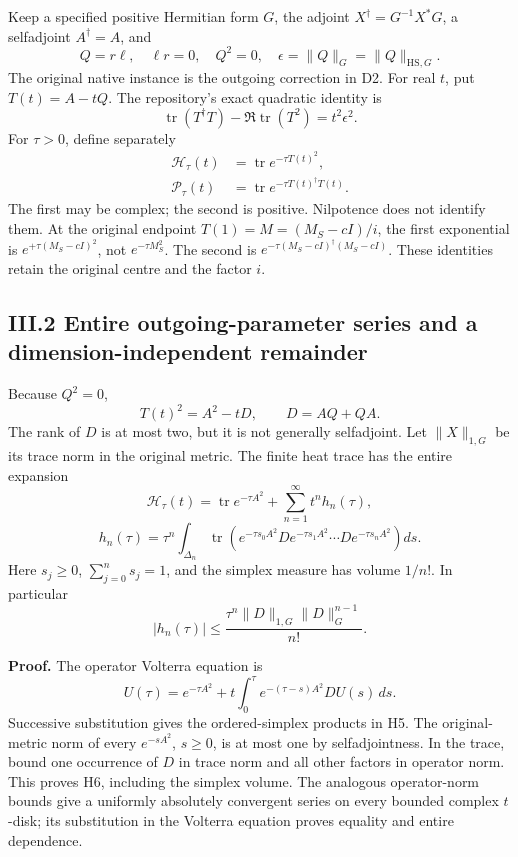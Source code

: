 Keep a specified positive Hermitian form \(G\), the adjoint
\(X^\dagger=G^{-1}X^*G\), a selfadjoint \(A^\dagger=A\), and \[
Q=r\ell,\quad \ell r=0,\quad Q^2=0,\quad
\epsilon=\|Q\|_G=\|Q\|_{\mathrm{HS},G}.
\] The original native instance is the outgoing correction in D2. For
real \(t\), put \(T(t)=A-tQ\). The repository's exact quadratic identity
is \[
\operatorname{tr}(T^\dagger T)-\Re\operatorname{tr}(T^2)
=t^2\epsilon^2.
\tag{H1}
\] For \(\tau>0\), define separately \[
\begin{aligned}
\mathcal H_\tau(t)&=\operatorname{tr}e^{-\tau T(t)^2},\\
\mathcal P_\tau(t)&=\operatorname{tr}e^{-\tau T(t)^\dagger T(t)}.
\end{aligned}
\tag{H2}
\] The first may be complex; the second is positive. Nilpotence does not
identify them. At the original endpoint \(T(1)=M=(M_S-cI)/i\), the first
exponential is \(e^{+\tau(M_S-cI)^2}\), not \(e^{-\tau M_S^2}\). The
second is \(e^{-\tau(M_S-cI)^\dagger(M_S-cI)}\). These identities retain
the original centre and the factor \(i\).

\subsection{III.2 Entire outgoing-parameter series and a
dimension-independent
remainder}\label{iii.2-entire-outgoing-parameter-series-and-a-dimension-independent-remainder}

Because \(Q^2=0\), \[
T(t)^2=A^2-tD,\qquad D=AQ+QA.
\tag{H3}
\] The rank of \(D\) is at most two, but it is not generally
selfadjoint. Let \(\|X\|_{1,G}\) be its trace norm in the original
metric. The finite heat trace has the entire expansion \[
\mathcal H_\tau(t)=\operatorname{tr}e^{-\tau A^2}
+\sum_{n=1}^\infty t^nh_n(\tau),
\tag{H4}
\] \[
h_n(\tau)=\tau^n\int_{\Delta_n}
\operatorname{tr}\left(e^{-\tau s_0A^2}D e^{-\tau s_1A^2}
\cdots D e^{-\tau s_nA^2}\right)ds.
\tag{H5}
\] Here \(s_j\ge0\), \(\sum_{j=0}^ns_j=1\), and the simplex measure has
volume \(1/n!\). In particular \[
\boxed{|h_n(\tau)|\le
\frac{\tau^n\|D\|_{1,G}\|D\|_G^{n-1}}{n!}.}
\tag{H6}
\]

\textbf{Proof.} The operator Volterra equation is \[
U(\tau)=e^{-\tau A^2}
+t\int_0^\tau e^{-(\tau-s)A^2}DU(s)\,ds.
\] Successive substitution gives the ordered-simplex products in H5. The
original-metric norm of every \(e^{-sA^2}\), \(s\ge0\), is at most one
by selfadjointness. In the trace, bound one occurrence of \(D\) in trace
norm and all other factors in operator norm. This proves H6, including
the simplex volume. The analogous operator-norm bounds give a uniformly
absolutely convergent series on every bounded complex \(t\)-disk; its
substitution in the Volterra equation proves equality and entire
dependence.

